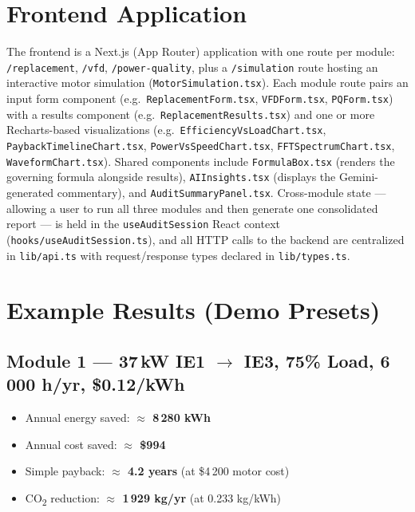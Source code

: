 \documentclass[11pt,a4paper]{article}
\newcommand{\code}[1]{\texttt{#1}}
\begin{document}
\section{Frontend Application}

The frontend is a Next.js (App Router) application with one route per
module: \code{/replacement}, \code{/vfd}, \code{/power-quality}, plus a
\code{/simulation} route hosting an interactive motor simulation
(\code{MotorSimulation.tsx}). Each module route pairs an input form
component (e.g.\ \code{ReplacementForm.tsx}, \code{VFDForm.tsx},
\code{PQForm.tsx}) with a results component (e.g.\
\code{ReplacementResults.tsx}) and one or more Recharts-based visualizations
(e.g.\ \code{EfficiencyVsLoadChart.tsx}, \code{PaybackTimelineChart.tsx},
\code{PowerVsSpeedChart.tsx}, \code{FFTSpectrumChart.tsx},
\code{WaveformChart.tsx}). Shared components include \code{FormulaBox.tsx}
(renders the governing formula alongside results), \code{AIInsights.tsx}
(displays the Gemini-generated commentary), and
\code{AuditSummaryPanel.tsx}. Cross-module state --- allowing a user to run
all three modules and then generate one consolidated report --- is held in
the \code{useAuditSession} React context (\code{hooks/useAuditSession.ts}),
and all HTTP calls to the backend are centralized in
\code{lib/api.ts} with request/response types declared in \code{lib/types.ts}.

\section{Example Results (Demo Presets)}

\subsection{Module 1 --- 37\,kW IE1 $\to$ IE3, 75\% Load, 6\,000 h/yr, \$0.12/kWh}

\begin{itemize}[nosep]
    \item Annual energy saved: \textbf{$\approx$ 8\,280 kWh}
    \item Annual cost saved: \textbf{$\approx$ \$994}
    \item Simple payback: \textbf{$\approx$ 4.2 years} (at \$4\,200 motor cost)
    \item CO\textsubscript{2} reduction: \textbf{$\approx$ 1\,929 kg/yr} (at 0.233 kg/kWh)
\end{itemize}
\end{document}

